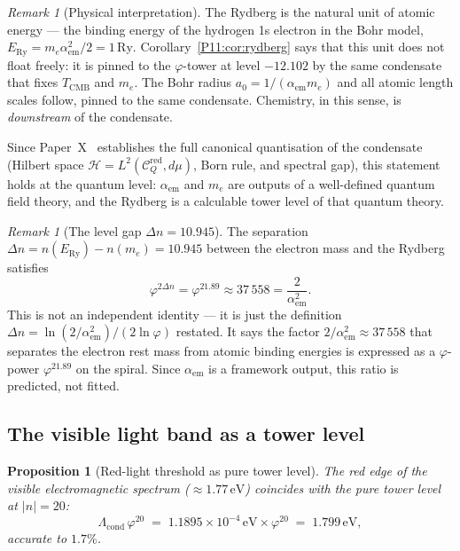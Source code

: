 \documentclass[11pt,a4paper]{article}
\newtheorem{proposition}[theorem]{Proposition}
\theoremstyle{definition}
\theoremstyle{remark}
\newtheorem{remark}[theorem]{Remark}
\newcommand{\vp}{\varphi}
\newcommand{\TCMB}{T_{\mathrm{CMB}}}
\newcommand{\Lcond}{\Lambda_{\mathrm{cond}}}
\newcommand{\ERy}{E_{\mathrm{Ry}}}
\newcommand{\aem}{\alpha_{\mathrm{em}}}
\begin{document}
\begin{remark}[Physical interpretation]
\label{P11:rem:rydberg_physical}
The Rydberg is the natural unit of atomic energy — the binding energy
of the hydrogen 1s electron in the Bohr model,
$\ERy = m_e \aem^2/2 = 1\,\mathrm{Ry}$.
Corollary~\ref{P11:cor:rydberg} says that this unit does not float freely:
it is pinned to the $\vp$-tower at level $-12.102$ by the same
condensate that fixes $\TCMB$ and $m_e$.
The Bohr radius $a_0 = 1/(\aem m_e)$ and all atomic length scales
follow, pinned to the same condensate.
Chemistry, in this sense, is \emph{downstream} of the condensate.

Since Paper~X~\cite{Paper10} establishes the full canonical quantisation
of the condensate (Hilbert space $\mathcal{H}=L^2(\mathcal{C}_Q^\mathrm{red},d\mu)$,
Born rule, and spectral gap), this statement holds at the quantum level:
$\aem$ and $m_e$ are outputs of a well-defined quantum field theory,
and the Rydberg is a calculable tower level of that quantum theory.
\end{remark}

\begin{remark}[The level gap $\Delta n = 10.945$]
The separation $\Delta n = n(\ERy) - n(m_e) = 10.945$
between the electron mass and the Rydberg satisfies
\begin{equation}
  \vp^{2\Delta n}
  = \vp^{21.89}
  \approx 37\,558
  = \frac{2}{\aem^2}.
  \label{P11:eq:gap}
\end{equation}
This is not an independent identity — it is just the definition
$\Delta n = \ln(2/\aem^2)/(2\ln\vp)$ restated.
It says the factor $2/\aem^2 \approx 37\,558$ that separates
the electron rest mass from atomic binding energies
is expressed as a $\vp$-power $\vp^{21.89}$ on the spiral.
Since $\aem$ is a framework output, this ratio is predicted,
not fitted.
\end{remark}

\subsection{The visible light band as a tower level}
\label{P11:sec:visible}

\begin{proposition}[Red-light threshold as pure tower level]
\label{P11:prop:visible}
The red edge of the visible electromagnetic spectrum
($\approx 1.77\,\mathrm{eV}$) coincides with the
pure tower level at $|n|=20$:
\begin{equation}
  \Lcond\,\vp^{20}
  \;=\; 1.1895\times10^{-4}\,\mathrm{eV}\times\vp^{20}
  \;=\; 1.799\,\mathrm{eV},
  \label{P11:eq:red_light}
\end{equation}
accurate to $1.7\%$.
\end{proposition}
\end{document}

